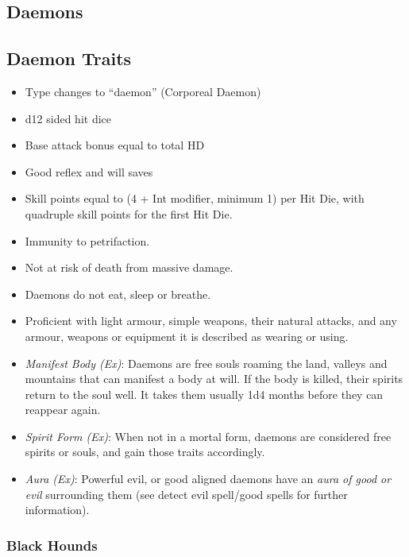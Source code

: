 \subsection{Daemons}
\label{sec:monsters:Daemons}

\subsection{Daemon Traits}
\label{sec:Daemon Traits}

\begin{itemize}[noitemsep]
  \item Type changes to ``daemon'' (Corporeal Daemon)
  \item d12 sided hit dice
  \item Base attack bonus equal to total HD
  \item Good reflex and will saves
  \item Skill points equal to (4 + Int modifier, minimum 1) per Hit Die, with
    quadruple skill points for the first Hit Die.
  \item Immunity to petrifaction.
  \item Not at risk of death from massive damage.
  \item Daemons do not eat, sleep or breathe.
  \item Proficient with light armour, simple weapons, their natural attacks,
    and any armour, weapons or equipment it is described as wearing or using.
  \item \emph{Manifest Body (Ex)}: Daemons are free souls roaming the land,
    valleys and mountains that can manifest a body at will. If the body is
    killed, their spirits return to the soul well. It takes them usually 1d4
    months before they can reappear again.
  \item \emph{Spirit Form (Ex)}: When not in a mortal form, daemons are
    considered free spirits or souls, and gain those traits accordingly.
  \item \emph{Aura (Ex)}: Powerful evil, or good aligned daemons have an
    \emph{aura of good or evil} surrounding them (see detect evil spell/good
    spells for further information).
\end{itemize}

\subsubsection{Black Hounds}
\label{sec:monsters:Black Hounds}

